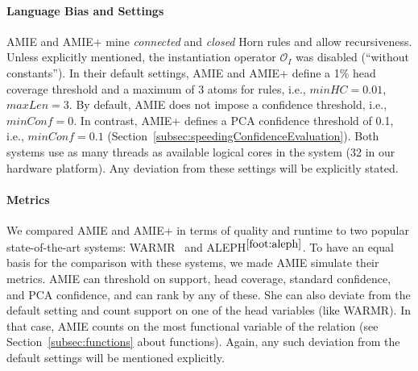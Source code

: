 \paragraph{Language Bias and Settings} 
AMIE and AMIE+ mine \emph{connected} and \emph{closed} Horn rules and allow recursiveness.
Unless explicitly mentioned, the instantiation operator $\mathcal{O}_I$ was disabled (``without constants'').
In their default settings, AMIE and AMIE+ define a 1\% head coverage threshold and a maximum of 3 atoms for rules, i.e., $minHC=0.01$, $maxLen=3$. 
By default, AMIE does not impose a confidence threshold, i.e., $minConf=0$. 
In contrast, AMIE+ defines a PCA confidence threshold of 0.1, i.e., $minConf=0.1$ (Section~\ref{subsec:speedingConfidenceEvaluation}).
Both systems use as many threads as available logical cores in the system (32 in our hardware platform). 
Any deviation from these settings will be explicitly stated. 


\paragraph{Metrics}
We compared AMIE and AMIE+ in terms of quality and runtime to two popular state-of-the-art systems:
WARMR~\cite{DehToi99,DehToi00} and ALEPH$^{\ref{foot:aleph}}$.
To have an equal basis for the comparison with these systems, we made AMIE
simulate their metrics.
AMIE can threshold on support, head coverage, standard confidence, and PCA confidence, and can rank by any of these.
She can also deviate from the default setting and count support on one of the head variables (like WARMR).
In that case, AMIE counts on the most functional variable of the relation (see Section~\ref{subsec:functions} about functions). 
Again, any such deviation from the default settings will be mentioned explicitly.


